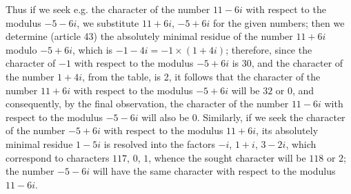 \documentclass[twoside,12pt]{memoir}
\begin{document}
Thus if we seek e{.}g{.} the character of the number \(11-6 i\) with respect to the modulus \(-5-6 i\), we substitute \(11+6 i\), \(-5+6 i\) for the given numbers; then we determine (article 43) the absolutely minimal residue of the number \(11+6 i\) modulo \(-5+6 i\), which is \(-1-4 i=-1 \times(1+4 i)\); therefore, since the character of \(-1\) with respect to the modulus \(-5+6 i\) is \(30\), and the character of the number \(1+4 i\), from the table, is 2, it follows that the character of the number \(11+6 i\) with respect to the modulus \(-5+6 i\) will be \(32\) or \(0\), and consequently, by the final observation, the character of the number \(11-6 i\) with respect to the modulus \(-5-6 i\) will also be \(0\). Similarly, if we seek the character of the number \(-5+6 i\) with respect to the modulus \(11+6 i\), its absolutely minimal residue \(1-5 i\) is resolved into the factors \(-i\), \(1+i\), \(3-2 i\), which correspond to characters \(117\), \(0\), \(1\), whence the sought character will be \(118\) or \(2\); the number \(-5-6 i\) will have the same character with respect to the modulus \(11-6 i\).
\end{document}
